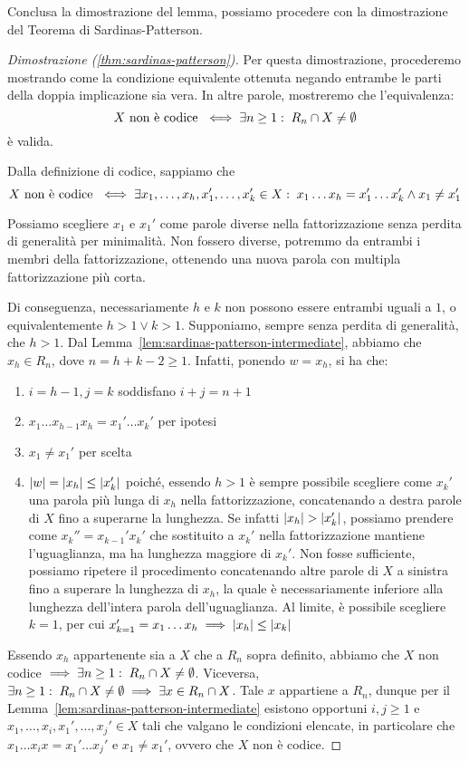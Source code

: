 Conclusa la dimostrazione del lemma, possiamo procedere con la dimostrazione del Teorema di Sardinas-Patterson.
\begin{proof}[Dimostrazione (\ref{thm:sardinas-patterson})]
  Per questa dimostrazione, procederemo mostrando come la condizione equivalente ottenuta negando entrambe le parti della doppia implicazione sia vera.
  In altre parole, mostreremo che l'equivalenza:
  \[X \text{ non è codice } \iff \exists n \geq 1 :\; R_n \cap X \neq \emptyset\]
  è valida.

  Dalla definizione di codice, sappiamo che 
  \[X \text{ non è codice } \iff \exists x_1, \ldots, x_h,x_1',\ldots,x_k' \in X :\; x_1\ldots x_h = x_1'\ldots x_k' \land x_1 \neq x_1'\]
  
  Possiamo scegliere \(x_1\) e \(x_1'\) come parole diverse nella fattorizzazione senza perdita di generalità per minimalità.
  Non fossero diverse, potremmo  da entrambi i membri della fattorizzazione, ottenendo una nuova parola con multipla fattorizzazione più corta.
  
  Di conseguenza, necessariamente \(h\) e \(k\) non possono essere entrambi uguali a \(1\), o equivalentemente \(h>1 \lor k>1\).
  Supponiamo, sempre senza perdita di generalità, che \(h>1\).
  Dal Lemma~\ref{lem:sardinas-patterson-intermediate}, abbiamo che \(x_h \in R_n\), dove \(n = h + k - 2 \geq 1\).
  Infatti, ponendo \(w = x_h\), si ha che:
  \begin{enumerate}
    \item \(i = h - 1, j = k\) soddisfano \(i + j = n + 1\)
    \item \(x_1\ldots x_{h-1} x_h = x_1'\ldots x_k'\) per ipotesi
    \item \(x_1 \neq x_1'\) per scelta
    \item \(\left|w\right| = \left|x_h\right| \leq \left|x_k'\right|\) poiché, essendo \(h>1\) è sempre possibile scegliere come \(x_k'\) una parola più lunga di \(x_h\) nella fattorizzazione, concatenando a destra parole di \(X\) fino a superarne la lunghezza.
      Se infatti \(\left|x_h\right| > \left|x_k'\right|\), possiamo prendere come \(x_k'' =  x_{k-1}'x_k'\) che sostituito a \(x_k'\) nella fattorizzazione mantiene l'uguaglianza, ma ha lunghezza maggiore di \(x_k'\). Non fosse sufficiente, possiamo ripetere il procedimento concatenando altre parole di \(X\) a sinistra fino a superare la lunghezza di \(x_h\), la quale è necessariamente inferiore alla lunghezza dell'intera parola dell'uguaglianza.
      Al limite, è possibile scegliere \(k=1\), per cui \(x_{k=1}' = x_1\ldots x_h \implies \left|x_h\right|\leq\left|x_k\right| \)
  \end{enumerate}
  Essendo \(x_h\) appartenente sia a \(X\) che a \(R_n\) sopra definito, abbiamo che \(X\) non codice \(\implies \exists n \geq 1 :\; R_n \cap X \neq \emptyset\).
  Viceversa, \(\exists n \geq 1 :\; R_n \cap X \neq \emptyset \implies \exists x \in R_n \cap X\).
  Tale \(x\) appartiene a \(R_n\), dunque per il Lemma~\ref{lem:sardinas-patterson-intermediate} esistono opportuni \(i,j \geq 1\) e \(x_1,\ldots,x_i,x_1',\ldots,x_j' \in X\) tali che valgano le condizioni elencate, in particolare che \(x_1\ldots x_i x = x_1'\ldots x_j'\) e \(x_1 \neq x_1'\), ovvero che \(X\) non è codice.
\end{proof}

